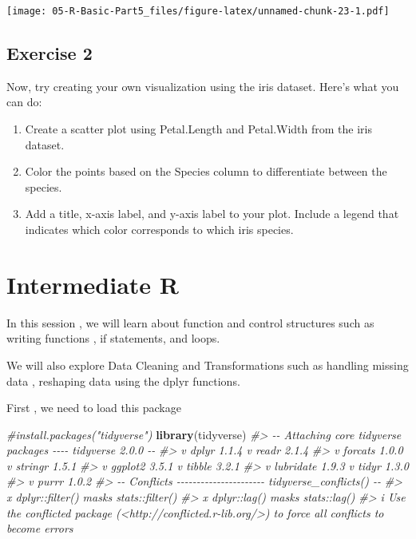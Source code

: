 \documentclass[
]{book}
\newenvironment{Shaded}{\begin{snugshade}}{\end{snugshade}}
\newcommand{\CommentTok}[1]{\textcolor[rgb]{0.56,0.35,0.01}{\textit{#1}}}
\newcommand{\FunctionTok}[1]{\textcolor[rgb]{0.13,0.29,0.53}{\textbf{#1}}}
\newcommand{\NormalTok}[1]{#1}
\providecommand{\tightlist}{%
  \setlength{\itemsep}{0pt}\setlength{\parskip}{0pt}}
\begin{document}
\texttt{[image: 05-R-Basic-Part5\_files/figure-latex/unnamed-chunk-23-1.pdf]}

\section*{Exercise 2}\label{exercise-2-2}

Now, try creating your own visualization using the iris dataset. Here's what you can do:

\begin{enumerate}
\def\labelenumi{\arabic{enumi}.}
\tightlist
\item
  Create a scatter plot using Petal.Length and Petal.Width from the iris dataset.
\item
  Color the points based on the Species column to differentiate between the species.
\item
  Add a title, x-axis label, and y-axis label to your plot.
  Include a legend that indicates which color corresponds to which iris species.
\end{enumerate}

\chapter*{Intermediate R}\label{intermediate-r}

In this session , we will learn about function and control structures such as writing functions , if statements, and loops.

We will also explore Data Cleaning and Transformations such as handling missing data , reshaping data using the dplyr functions.

First , we need to load this package

\begin{Shaded}
\begin{Highlighting}[]
\CommentTok{\#install.packages("tidyverse")}
\FunctionTok{library}\NormalTok{(tidyverse)}
\CommentTok{\#\textgreater{} {-}{-} Attaching core tidyverse packages {-}{-}{-}{-} tidyverse 2.0.0 {-}{-}}
\CommentTok{\#\textgreater{} v dplyr     1.1.4     v readr     2.1.4}
\CommentTok{\#\textgreater{} v forcats   1.0.0     v stringr   1.5.1}
\CommentTok{\#\textgreater{} v ggplot2   3.5.1     v tibble    3.2.1}
\CommentTok{\#\textgreater{} v lubridate 1.9.3     v tidyr     1.3.0}
\CommentTok{\#\textgreater{} v purrr     1.0.2     }
\CommentTok{\#\textgreater{} {-}{-} Conflicts {-}{-}{-}{-}{-}{-}{-}{-}{-}{-}{-}{-}{-}{-}{-}{-}{-}{-}{-}{-}{-}{-} tidyverse\_conflicts() {-}{-}}
\CommentTok{\#\textgreater{} x dplyr::filter() masks stats::filter()}
\CommentTok{\#\textgreater{} x dplyr::lag()    masks stats::lag()}
\CommentTok{\#\textgreater{} i Use the conflicted package (\textless{}http://conflicted.r{-}lib.org/\textgreater{}) to force all conflicts to become errors}
\end{Highlighting}
\end{Shaded}
\end{document}
